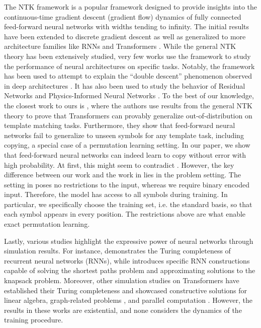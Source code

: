 The NTK framework \citep{NEURIPS2018_5a4be1fa} is a popular framework designed to provide insights into the continuous-time gradient descent (gradient flow) dynamics of fully connected feed-forward neural networks with widths tending to infinity. The initial results have been extended to discrete gradient descent \citep{NEURIPS2019_0d1a9651} as well as generalized to more architecture families like RNNs and Transformers \citep{yang2020tensorprogramsiineural, yang2021tensorprogramsiibarchitectural}. While the general NTK theory has been extensively studied, very few works use the framework to study the performance of neural architectures on specific tasks. Notably, the framework has been used to attempt to explain the ``double descent'' phenomenon \citep{Nakkiran2020Deep} observed in deep architectures \citep{pmlr-v119-adlam20a, singh2022phenomenology}. It has also been used to study the behavior of Residual Networks \citep{CSIAM-AM-3-4} and Physics-Informed Neural Networks \citep{WANG2022110768}. To the best of our knowledge, the closest work to ours is \cite{boix-adsera2024when}, where the authors use results from the general NTK theory to prove that Transformers can provably generalize out-of-distribution on template matching tasks. Furthermore, they show that feed-forward neural networks fail to generalize to unseen symbols for any template task, including copying, a special case of a permutation learning setting. In our paper, we show that feed-forward neural networks can indeed learn to copy without error with high probability. At first, this might seem to contradict \cite{boix-adsera2024when}. However, the key difference between our work and the work in \cite{boix-adsera2024when} lies in the problem setting. The setting in \cite{boix-adsera2024when} poses no restrictions to the input, whereas we require binary encoded input. Therefore, the model has access to all symbols during training. In particular, we specifically choose the training set, i.e. the standard basis, so that each symbol appears in every position. 
The restrictions above are what enable exact permutation learning.      

Lastly, various studies highlight the expressive power of neural networks through simulation results. For instance, \citet{siegelman95comp} demonstrates the Turing completeness of recurrent neural networks (RNNs), while \citet{hertrich2023provably} introduces specific RNN constructions capable of solving the shortest paths problem and approximating solutions to the knapsack problem. Moreover, other simulation studies on Transformers have established their Turing completeness \citep{perez2021attention, wei2022statistically} and showcased constructive solutions for linear algebra, graph-related problems \citep{giannou23a, pmlr-v235-back-de-luca24a, yang2023looped}, and parallel computation \citep{deluca2025positionalattentionexpressivitylearnability}. However, the results in these works are existential, and none considers the dynamics of the training procedure.

